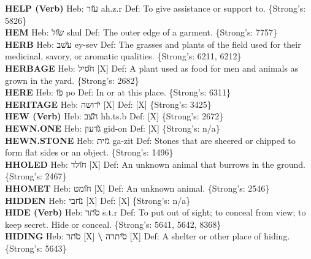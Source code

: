{\textbf{HELP (Verb)} Heb: {\large\H עזר} ah.z.r Def: To give assistance or support to. \{Strong's: 5826\}\hfill{}\\

\textbf{HEM} Heb: {\large\H שול} shul Def: The outer edge of a garment. \{Strong's: 7757\}\hfill{}\\

\textbf{HERB} Heb: {\large\H עשב} ey-sev Def: The grasses and plants of the field used for their medicinal, savory, or aromatic qualities. \{Strong's: 6211, 6212\}\hfill{}\\

\textbf{HERBAGE} Heb: {\large\H חסיל} {[}X{]} Def: A plant used as food for men and animals as grown in the yard. \{Strong's: 2682\}\hfill{}\\

\textbf{HERE} Heb: {\large\H פו} po Def: In or at this place. \{Strong's: 6311\}\hfill{}\\

\textbf{HERITAGE} Heb: {\large\H ירושה} {[}X{]} Def: {[}X{]} \{Strong's: 3425\}\hfill{}\\

\textbf{HEW (Verb)} Heb: {\large\H חצב} hh.ts.b Def: {[}X{]} \{Strong's: 2672\}\hfill{}\\

\textbf{HEWN.ONE} Heb: {\large\H גדעון} gid-on Def: {[}X{]} \{Strong's: n/a\}\hfill{}\\

\textbf{HEWN.STONE} Heb: {\large\H גזית} ga-zit Def: Stones that are sheered or chipped to form flat sides or an object. \{Strong's: 1496\}\hfill{}\\

\textbf{HHOLED} Heb: {\large\H חולד} {[}X{]} Def: An unknown animal that burrows in the ground. \{Strong's: 2467\}\hfill{}\\

\textbf{HHOMET} Heb: {\large\H חומט} {[}X{]} Def: An unknown animal. \{Strong's: 2546\}\hfill{}\\

\textbf{HIDDEN} Heb: {\large\H נחבי} {[}X{]} Def: {[}X{]} \{Strong's: n/a\}\hfill{}\\

\textbf{HIDE (Verb)} Heb: {\large\H סתר} s.t.r Def: To put out of sight; to conceal from view; to keep secret. Hide or conceal. \{Strong's: 5641, 5642, 8368\}\hfill{}\\

\textbf{HIDING} Heb: {\large\H סתר} {[}X{]} \textbf{\textbackslash{}} {\large\H סיתרה} {[}X{]} Def: A shelter or other place of hiding. \{Strong's: 5643\}\hfill{}\\

}
